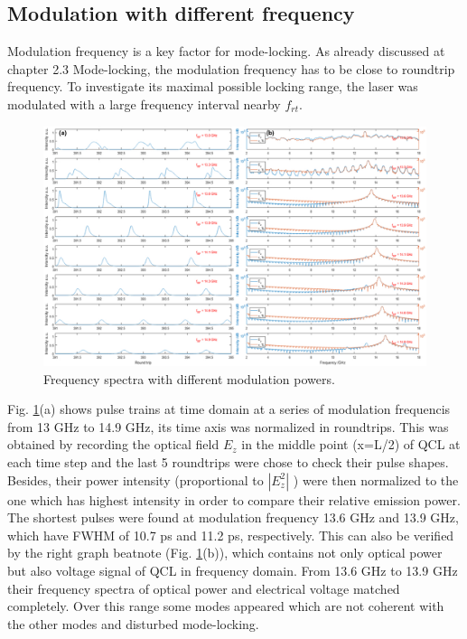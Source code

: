 \documentclass[11pt,final]{scrbook}
\begin{document}
\subsection{Modulation with different frequency} 
Modulation frequency is a key factor for mode-locking. As already discussed at chapter 2.3 Mode-locking, the modulation frequency has to be close to roundtrip frequency. To investigate its maximal possible locking range, the laser was modulated with a large frequency interval nearby $f_{rt}$.
\begin{figure}[htbp]
\begin{center}
\includegraphics[scale=0.37]{images/modF_spectra.pdf}
\caption{Frequency spectra with different modulation powers.}
\label{fig:modF_spectra}
\end{center}
\end{figure}

Fig. \ref{fig:modF_spectra}(a) shows pulse trains at time domain at a series of modulation frequencis from 13 GHz to 14.9 GHz, its time axis was normalized in roundtrips. This was obtained by recording the optical field $E_{z}$ in the middle point (x=L/2) of QCL at each time step and the last 5 roundtrips were chose to check their pulse shapes. Besides, their power intensity (proportional to $|E_{z}^{2}|$ ) were then normalized to the one which has highest intensity in order to compare their relative emission power.  The shortest pulses were found at modulation frequency 13.6 GHz and 13.9 GHz, which have FWHM of 10.7 ps and 11.2 ps, respectively. This can also be verified by the right graph beatnote (Fig. \ref{fig:modF_spectra}(b)), which contains not only optical power but also voltage signal of QCL in frequency domain. From 13.6 GHz to 13.9 GHz their frequency spectra of optical power and electrical voltage matched completely. Over this range some modes appeared which are not coherent with the other modes and disturbed mode-locking.
\end{document}
